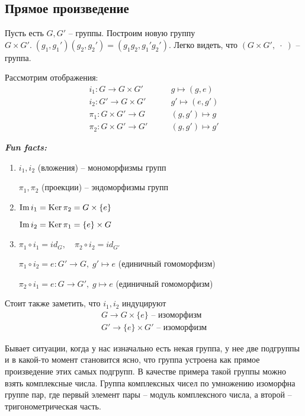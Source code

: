 \subsection*{Прямое произведение}
Пусть есть $G, G'$ -- группы. Построим новую группу 
$G \times G'. \; (g_1, g_1')(g_2, g_2') = (g_1g_2, g_1'g_2')$. Легко видеть, 
что $(G \times G', \; \cdot \; )$ -- группа. 

\begin{theorem-non} 
    Рассмотрим отображения: 
    \begin{align*}
        i_1: G \longrightarrow G \times G' &\qquad g \longmapsto (g, e) \\
        i_2: G' \longrightarrow G \times G' &\qquad g' \longmapsto (e, g') \\
        \pi_1: G \times G' \longrightarrow G &\qquad (g, g') \longmapsto g \\
        \pi_2: G \times G' \longrightarrow G' &\qquad (g, g') \longmapsto g'
    \end{align*}
\end{theorem-non}
\textbf{\textit{Fun facts: }}
\begin{enumerate}
    \item $i_1, i_2$ (вложения) -- мономорфизмы групп
    
    $\pi_1, \pi_2$ (проекции) -- эндоморфизмы групп
    \item $\operatorname{Im}{i_1} = \operatorname{Ker}{\pi_2} = G \times \{e\}$
    
    $\operatorname{Im}{i_2} = \operatorname{Ker}{\pi_1} = \{e\} \times G$
    \item $\pi_1 \circ i_1 = id_G, \quad \pi_2 \circ i_2 = id_{G'}$
    
    $\pi_1 \circ i_2 = e: G' \longrightarrow G, \; g' \longmapsto e$ (единичный гомоморфизм)

    $\pi_2 \circ i_1 = e: G \longrightarrow G', \; g \longmapsto e$ (единичный гомоморфизм)
\end{enumerate}

Стоит также заметить, что $i_1, i_2$ индуцируют 
\begin{gather*}
    G \longrightarrow G \times \{e\} \text{ -- изоморфизм} \\
    G' \longrightarrow \{e\} \times G' \text{ -- изоморфизм}
\end{gather*}

Бывает ситуации, когда у нас изначально есть некая группа, у нее две подгруппы и в какой-то момент становится 
ясно, что группа устроена как прямое произведение этих самых подгрупп. В качестве примера такой группы можно взять 
комплексные числа. Группа комплексных чисел по умножению изоморфна группе пар, где первый элемент пары -- 
модуль комплексного числа, а второй -- тригонометрическая часть. 

